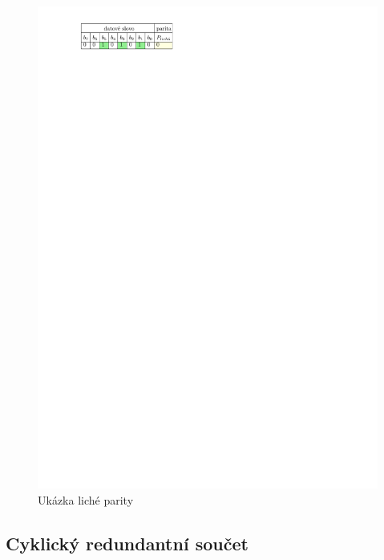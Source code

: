 \begin{figure}[H]
    \begin{center}
        \includegraphics[scale=1]{img/parita_licha}
    \end{center}
    \caption{Ukázka liché parity}
\end{figure}

\subsection{Cyklický redundantní součet}
